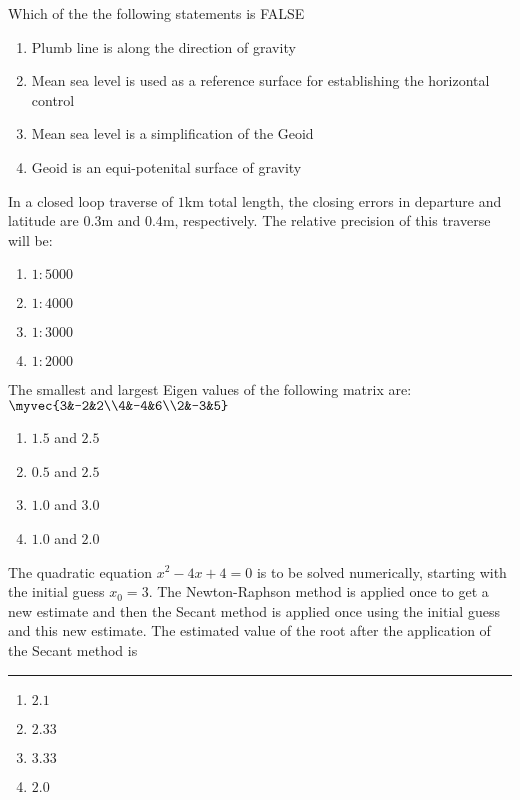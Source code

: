 \item{
Which of the the following statements is FALSE
\begin{enumerate}
\item Plumb line is along the direction of gravity
\item Mean sea level  is used as a reference surface for establishing the horizontal control
\item Mean sea level  is a simplification of the Geoid
\item Geoid is an equi-potenital surface of gravity
\end{enumerate}
}
\item{
In a closed loop traverse of $1$km total length, the closing errors in departure and latitude are $0.3$m and $0.4$m, respectively. The relative precision of this traverse will be: 
\begin{multicols}{4}
\begin{enumerate}
\item $1:5000$
\item $1:4000$
\item $1:3000$
\item $1:2000$
\end{enumerate}
\end{multicols}
}
\item{
The smallest and largest Eigen values of the following matrix are: $\myvec{3&-2&2\\4&-4&6\\2&-3&5}$ 
\begin{multicols}{4}
\begin{enumerate}
\item $1.5$ and $2.5$
\item $0.5$ and $2.5$
\item $1.0$ and $3.0$
\item $1.0$ and $2.0$
\end{enumerate}
\end{multicols}
}
\item{
The quadratic equation $x^2 - 4x + 4 = 0$ is to be solved numerically, starting with the initial guess $x_0 = 3$. The Newton-Raphson method is applied once to get a new estimate and then the Secant method is applied once using the initial guess and this new estimate. The estimated value of the root after the application of the Secant method is \rule{3cm}{0.15mm}
\begin{multicols}{4}
\begin{enumerate}
\item $2.1$
\item $2.33$
\item $3.33$
\item $2.0$
\end{enumerate}
\end{multicols}
}
